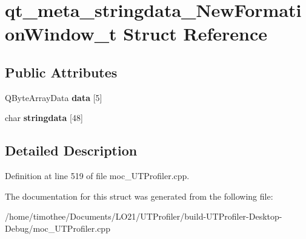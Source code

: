 \hypertarget{structqt__meta__stringdata___new_formation_window__t}{\section{qt\-\_\-meta\-\_\-stringdata\-\_\-\-New\-Formation\-Window\-\_\-t Struct Reference}
\label{structqt__meta__stringdata___new_formation_window__t}
}
\subsection*{Public Attributes}
\begin{DoxyCompactItemize}
\item 
\hypertarget{structqt__meta__stringdata___new_formation_window__t_a1adc4e8ad5abaf0be36e061a70fbeef7}{Q\-Byte\-Array\-Data {\bfseries data} \mbox{[}5\mbox{]}}\label{structqt__meta__stringdata___new_formation_window__t_a1adc4e8ad5abaf0be36e061a70fbeef7}

\item 
\hypertarget{structqt__meta__stringdata___new_formation_window__t_ac8539fb19c68ebd04d854752aeb4fd81}{char {\bfseries stringdata} \mbox{[}48\mbox{]}}\label{structqt__meta__stringdata___new_formation_window__t_ac8539fb19c68ebd04d854752aeb4fd81}

\end{DoxyCompactItemize}


\subsection{Detailed Description}


Definition at line 519 of file moc\-\_\-\-U\-T\-Profiler.\-cpp.



The documentation for this struct was generated from the following file\-:\begin{DoxyCompactItemize}
\item 
/home/timothee/\-Documents/\-L\-O21/\-U\-T\-Profiler/build-\/\-U\-T\-Profiler-\/\-Desktop-\/\-Debug/moc\-\_\-\-U\-T\-Profiler.\-cpp\end{DoxyCompactItemize}
